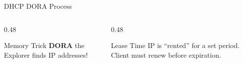 \documentclass[aspectratio=169, 11pt]{beamer}
\begin{document}
\begin{frame}{DHCP DORA Process}
    \vspace{0.2em}
    \begin{columns}[T]
        \begin{column}{0.48\textwidth}
            \begin{block}{Memory Trick}
                \small
                \textbf{DORA} the Explorer finds IP addresses!
            \end{block}
        \end{column}
        \begin{column}{0.48\textwidth}
            \begin{exampleblock}{Lease Time}
                \small
                IP is ``rented'' for a set period. Client must renew before expiration.
            \end{exampleblock}
        \end{column}
    \end{columns}
\end{frame}
\end{document}
